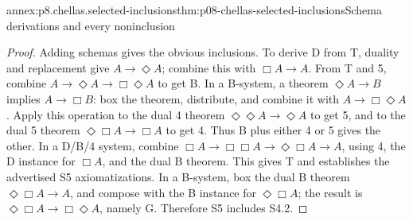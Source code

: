 \begin{annexitem}{annex:p8.chellas.selected-inclusions}{thm:p08-chellas-selected-inclusions}{Schema derivations and every noninclusion}
\begin{proof}
Adding schemas gives the obvious inclusions. To derive D from T, duality
and replacement give \(A\to\Diamond A\); combine this with
\(\Box A\to A\). From T and 5, combine
\(A\to\Diamond A\to\Box\Diamond A\) to get B.
In a B-system, a theorem \(\Diamond A\to B\) implies
\(A\to\Box B\): box the theorem, distribute, and combine it
with \(A\to\Box\Diamond A\). Apply this operation to the
dual 4 theorem \(\Diamond\Diamond A\to\Diamond A\) to get
5, and to the dual 5 theorem \(\Diamond\Box A\to\Box A\)
to get 4. Thus B plus either 4 or 5 gives the other.
In a D/B/4 system, combine
\(\Box A\to\Box\Box A\to\Diamond\Box A\to A\),
using 4, the D instance for \(\Box A\), and the dual B theorem.
This gives T and establishes the advertised S5 axiomatizations.
In a B-system, box the dual B theorem
\(\Diamond\Box A\to A\), and compose with the B instance for
\(\Diamond\Box A\); the result is
\(\Diamond\Box A\to\Box\Diamond A\), namely G.
Therefore S5 includes S4.2.


\end{proof}
\end{annexitem}
